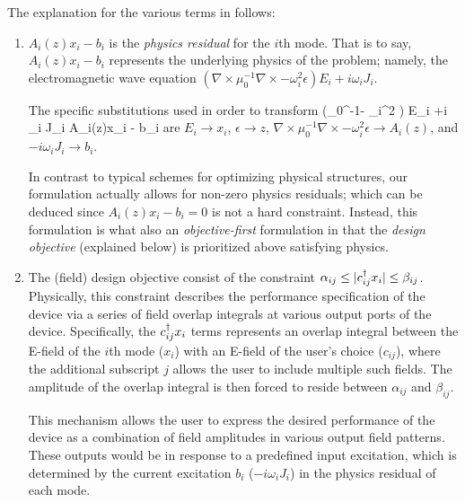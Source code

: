 The explanation for the various terms in  follows:
\begin{enumerate}
\item 
    $A_i(z)x_i - b_i$ is the \emph{physics residual} for the $i$th mode.
    That is to say, $A_i(z)x_i - b_i$ represents the underlying physics
        of the problem; namely, the electromagnetic wave equation
        \mbox{$(\nabla\times\mu_0^{-1}\nabla\times - \omega_i^2 \epsilon) E_i 
            +i \omega_i J_i $}.

    The specific substitutions used in order to transform
        \BE (\nabla\times\mu_0^{-1}\nabla\times - \omega_i^2 \epsilon) E_i 
            +i \omega_i J_i  \quad\longrightarrow\quad A_i(z)x_i - b_i \EE
        are
    \BI $E_i \to x_i$,
    \I  $\epsilon \to z$,
    \I  $\nabla\times\mu_0^{-1}\nabla\times - \omega_i^2 \epsilon \to A_i(z)$, and
    \I  $ -i\omega_i J_i \to b_i$.  \EI

    In contrast to typical schemes for optimizing physical structures,
        our formulation actually allows for non-zero physics residuals;
        which can be deduced since $A_i(z)x_i-b_i=0$ is not a hard constraint.
    Instead, this formulation is what also an \emph{objective-first} \cite{Lu12}
        formulation in that the \emph{design objective} (explained below)
        is prioritized above satisfying physics.

\item
    The (field) design objective consist of 
        the constraint $\alpha_{ij} \le |c_{ij}^\dagger x_i| \le \beta_{ij}$.
    Physically, this constraint describes 
        the performance specification of the device 
        via a series of field overlap integrals 
        at various output ports of the device.
    Specifically, the $c_{ij}^\dagger x_i$ terms represents an overlap integral between
        the E-field of the $i$th mode ($x_i$)
        with an E-field of the user's choice ($c_{ij}$),
        where the additional subscript $j$ allows the user
        to include multiple such fields.
    The amplitude of the overlap integral is then forced to reside between
        $\alpha_{ij}$ and $\beta_{ij}$.

    This mechanism allows the user to express 
        the desired performance of the device
        as a combination of field amplitudes in various output field patterns.
    These outputs would be in response to a predefined input excitation,
        which is determined by the current excitation $b_i$ ($-i\omega_i J_i$)
        in the physics residual of each mode.


\end{enumerate}

